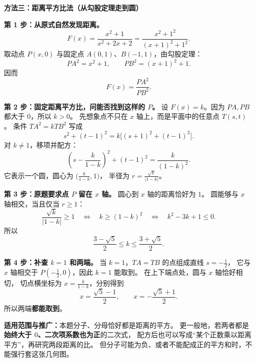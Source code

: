 \clearpage
\begin{proofbox}
\textbf{\textcolor{CProof}{方法三：距离平方比法（从勾股定理走到圆）}}

\textbf{第 1 步：从原式自然发现距离。}
\[
  F(x)=\frac{x^2+1}{x^2+2x+2}
  =\frac{x^2+1^2}{(x+1)^2+1^2}.
\]
取动点 $P(x,0)$ 与固定点 $A(0,1)$、$B(-1,1)$，由勾股定理：
\[
   PA^2=x^2+1,\qquad PB^2=(x+1)^2+1.
\]
因而
\[
  \boxed{F(x)=\frac{PA^2}{PB^2}.}
\]
\begin{center}\end{center}

\textbf{第 2 步：固定距离平方比，问能否找到这样的 $P$。}
设 $F(x)=k$。因为 $PA,PB$ 都大于 $0$，所以 $k>0$。
先想象点不只在 $x$ 轴上，而是平面中的任意点 $T(s,t)$。
条件 $TA^2=kTB^2$ 写成
\[
   s^2+(t-1)^2=k\bigl[(s+1)^2+(t-1)^2\bigr].
\]
对 $k\ne1$，移项并配方：
\[
  \boxed{\left(s-\frac{k}{1-k}\right)^2+(t-1)^2
    =\frac{k}{(1-k)^2}.}
\]
它表示一个圆，圆心为 $\bigl(\frac{k}{1-k},1\bigr)$，
半径为 $r=\frac{\sqrt{k}}{|1-k|}$。

\textbf{第 3 步：原题要求点 $P$ 留在 $x$ 轴。}
圆心到 $x$ 轴的距离恰好为 $1$。
圆能够与 $x$ 轴相交，当且仅当 $r\ge1$：
\[
  \frac{\sqrt{k}}{|1-k|}\ge1
  \quad\Longleftrightarrow\quad k\ge(1-k)^2
  \quad\Longleftrightarrow\quad k^2-3k+1\le0.
\]
所以
\[
  \boxed{\frac{3-\sqrt5}{2}\le k\le\frac{3+\sqrt5}{2}}.
\]

\textbf{第 4 步：补查 $k=1$ 和两端。}
当 $k=1$，$TA=TB$ 的点组成直线 $s=-\frac12$，
它与 $x$ 轴相交于 $P(-\frac12,0)$，因此 $k=1$ 能取到。
在上下端点处，圆与 $x$ 轴恰好相切，
切点横坐标为 $x=\frac{k}{1-k}$，分别得到
\[
 x=\frac{\sqrt5-1}{2},\qquad x=-\frac{\sqrt5+1}{2}.
\]
所以两端\textbf{都能取到}。

\medskip
\textbf{适用范围与推广：}本题分子、分母恰好都是距离的平方。
更一般地，若两者都是\textbf{始终大于 $0$、二次项系数也为正}的二次式，
配方后也可以写成“某个正数乘以距离平方”，再研究两段距离的比。
但分子可能为负、或者不能配成正的平方和时，不能强行套这张几何图。
\end{proofbox}

